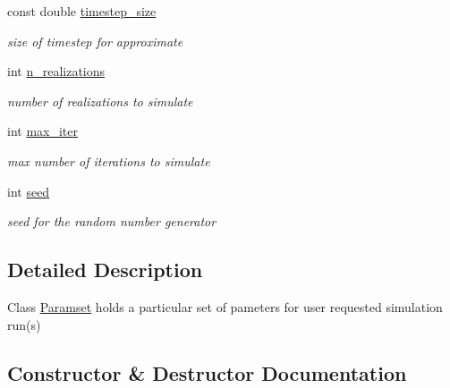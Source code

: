 \begin{DoxyCompactItemize}
\mbox{\label{class_paramset_a0554913cf803a67bc59ffdee154abc24}} 
const double \hyperlink{class_paramset_a0554913cf803a67bc59ffdee154abc24}{timestep\+\_\+size}
\begin{DoxyCompactList}\small\item\em size of timestep for approximate \end{DoxyCompactList}\item 
\mbox{\label{class_paramset_a50c0325e75983b66d0825406ec7873ac}} 
int \hyperlink{class_paramset_a50c0325e75983b66d0825406ec7873ac}{n\+\_\+realizations}
\begin{DoxyCompactList}\small\item\em number of realizations to simulate \end{DoxyCompactList}\item 
\mbox{\label{class_paramset_afeb86c327cd6966707996019609e6ed1}} 
int \hyperlink{class_paramset_afeb86c327cd6966707996019609e6ed1}{max\+\_\+iter}
\begin{DoxyCompactList}\small\item\em max number of iterations to simulate \end{DoxyCompactList}\item 
\mbox{\label{class_paramset_ab8a5866bb87cc2d78a69c47bacaeb06e}} 
int \hyperlink{class_paramset_ab8a5866bb87cc2d78a69c47bacaeb06e}{seed}
\begin{DoxyCompactList}\small\item\em seed for the random number generator \end{DoxyCompactList}\end{DoxyCompactItemize}


\subsection{Detailed Description}
Class \hyperlink{class_paramset}{Paramset} holds a particular set of pameters for user requested simulation run(s) 

\subsection{Constructor \& Destructor Documentation}
\mbox{\label{class_paramset_aa62d7992b29e74983af7d6026b7111c0}} 
